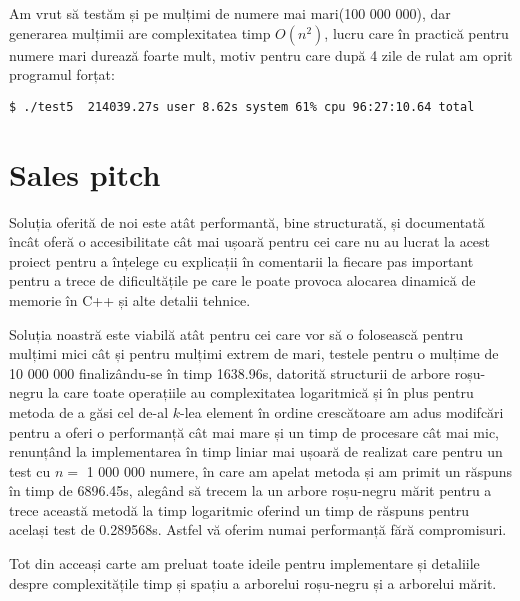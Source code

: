 \documentclass[]{report}
\begin{document}
	Am vrut să testăm și pe mulțimi de numere mai mari(100 000 000), dar generarea
	mulțimii are complexitatea timp $O(n^2)$, lucru care în practică pentru numere
	mari durează foarte mult, motiv pentru care după 4 zile de rulat am oprit
	programul forțat:

	\begin{lstlisting}
$ ./test5  214039.27s user 8.62s system 61% cpu 96:27:10.64 total
	\end{lstlisting}

	\chapter*{Sales pitch}
	
	Soluția oferită de noi este atât performantă, bine structurată, și documentată
	încât oferă o accesibilitate cât mai ușoară pentru cei care nu au lucrat la
	acest proiect pentru a înțelege cu explicații în comentarii la fiecare pas
	important pentru a trece de dificultățile pe care le poate provoca alocarea
	dinamică de memorie în C++ și alte detalii tehnice.

	Soluția noastră este viabilă atât pentru cei care vor să o folosească pentru
	mulțimi mici cât și pentru mulțimi extrem de mari, testele pentru o mulțime 
	de 10 000 000 finalizându-se în timp 1638.96s, datorită structurii de arbore
	roșu-negru la care toate operațiile au complexitatea logaritmică și în plus
	pentru metoda de a găsi cel de-al $k$-lea element în ordine crescătoare am
	adus modifcări pentru a oferi o performanță cât mai mare și un timp de
	procesare cât mai mic, renunțând la implementarea în timp liniar mai ușoară
	de realizat care pentru un test cu $n=$ 1 000 000 numere, în care am 
	apelat metoda și am primit un răspuns în timp de 6896.45s, alegând să trecem
	la un arbore roșu-negru mărit pentru a trece această metodă la timp logaritmic
	oferind un timp de răspuns pentru același test de 0.289568s. Astfel vă oferim
	numai performanță fără compromisuri.

\printbibliography
	Tot din acceași carte am preluat toate ideile pentru implementare și detaliile
	despre complexitățile timp și spațiu a arborelui roșu-negru și a arborelui
	mărit.
\end{document}
